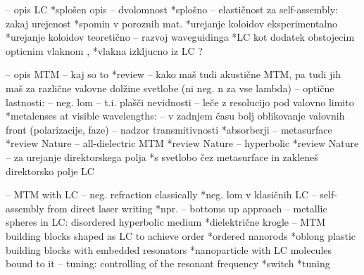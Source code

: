 \documentclass[a4paper,11pt]{article}
\begin{document}
-- opis LC *splošen opis \cite{degennes}
  -- dvolomnost *splošno \cite{hecht-optics}
  -- elastičnost za self-assembly: zakaj urejenost *spomin v poroznih mat. \cite{tanaka-lc-memory-porous} 
                                                   *urejanje koloidov eksperimentalno \cite{musevic-2013-assembly,smalyukh-2009-assembly} 
                                                   *urejanje koloidov teoretično \cite{zumer-2012-colloidal-assembly}
  -- razvoj waveguidinga *LC kot dodatek obstojecim opticnim vlaknom \cite{kitzerow-2014-lc-fibre,zografopoulos-2012-lc-fibre}, 
                         *vlakna izkljucno iz LC \cite{cancula-2016-waveguiding}? 

-- opis MTM
  -- kaj so to *review \cite{wegener-2011-nature-review}
  -- kako maš tudi akustične MTM, pa tudi jih maš za različne valovne dolžine svetlobe (ni neg. n za vse lambda)
  -- optične lastnosti: 
    -- neg. lom \cite{schultz-2000-first-mtm,zhang-2008-fishnet}
    -- t.i. plašči nevidnosti \cite{zhang-2015-skin-cloak}
    -- leče z resolucijo pod valovno limito *metalenses at visible wavelengths: \cite{capasso-2016-metalens}
    -- v zadnjem času bolj oblikovanje valovnih front (polarizacije, faze) \cite{capasso-2014-flat-optics-metasurface}
    -- nadzor transmitivnosti *absorberji \cite{padilla-2012-mtm-absorbers}
    -- metasurface *review Nature \cite{meinzer-2014-metasurface}
    -- all-dielectric MTM *review Nature \cite{jacob-2016-all-dielectric}
    -- hyperbolic *review Nature \cite{kivshar-2013-hyperbolic}
    -- za urejanje direktorskega polja *s svetlobo čez metasurface in zakleneš direktorsko polje LC \cite{ozaki-2016-patterned-lc}

-- MTM with LC
  -- neg. refraction classically *neg. lom v klasičnih LC \cite{lavrentovich-2006-lc-neg,assanto-2007-nematicons-lc-neg}
  -- self-assembly from direct laser writing *npr. \cite{tartan-2017-dlw} -- bottoms up approach
  -- metallic spheres in LC: disordered hyperbolic medium *dielektrične krogle \cite{xuan-2013-nanoparticle-lc,khoo-2014-nanoparticle-lc}
  -- MTM building blocks shaped as LC to achieve order *ordered nanorods \cite{lavrentovich-2008-gold-nanorods,smalyukh-2010-self-alignment,lavrentovich-2009-nanorods} 
                                                       *oblong plastic building blocks with embedded resonators \cite{shadrivov-2016-meta-liquid-crystal}
                                                       *nanoparticle with LC molecules bound to it \cite{goodby-2011-lc-gold-mtm}
  -- tuning: controlling of the resonant frequency *switch \cite{buchnev-2015-lc-mtm-switch}
                                                   *tuning \cite{zhang-2007-lc-mtm-tuning}
\end{document}

